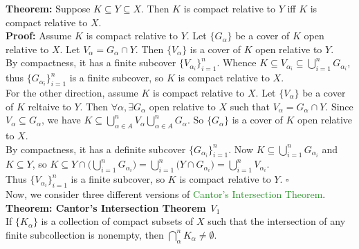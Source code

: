 \documentclass{article}
\begin{document}
\textbf{Theorem:} Suppose $K \subseteq Y \subseteq X$. Then $K$ is compact relative to $Y$ iff $K$ is compact relative to $X$. \\

\textbf{Proof:} Assume $K$ is compact relative to $Y$. Let $\{G_{\alpha}\}$ be a cover of $K$ open relative to $X$. Let $V_{\alpha}= G_{\alpha} \cap Y$. Then $\{V_{\alpha}\}$ is a cover of $K$ open relative to $Y$.\\

By compactness, it has a finite subcover $\{V_{\alpha_i}\}_{i=1}^n$. Whence $K \subseteq V_{\alpha_i} \subseteq \bigcup_{i = 1}^nG_{\alpha_i}$, thus $\{G_{\alpha_i}\}_{i=1}^n$ is a finite subcover, so $K$ is compact relative to $X$.\\

For the other direction, assume $K$ is compact relative to $X$. Let $\{V_{\alpha}\}$ be a cover of $K$ reltaive to $Y$. Then $\forall \alpha, \exists G_{\alpha}$ open relative to $X$ such that $V_{\alpha} = G_{\alpha} \cap Y$. Since $V_{\alpha} \subseteq G_{\alpha}$, we have $K \subseteq \bigcup_{\alpha \in A}^n V_{\alpha} \bigcup_{\alpha \in A}^nG_{\alpha}$. So $\{G_{\alpha}\}$ is a cover of $K$ open relative to $X$. \\

By compactness, it has a definite subcover $\{G_{\alpha_i}\}_{i=1}^n$. Now $K \subseteq \bigcup_{i=1}^n G_{\alpha_i}$ and $K \subseteq Y$, so $K \subseteq Y \cap \bigl(\bigcup_{i=1}^n G_{\alpha_i}\bigr)=\bigcup_{i=1}^n(Y \cap G_{\alpha_i}\bigr)=\bigcup_{i=1}^nV_{\alpha_i}$.\\

Thus $\{V_{\alpha_i}\}_{i=1}^n$ is a finite subcover, so $K$ is compact relative to $Y$. $\square$\\


Now, we consider three different versions of \textcolor{ForestGreen}{Cantor's Intersection Theorem}.\\

\textbf{Theorem: Cantor's Intersection Theorem} \textit{V$_1$}\\
If $\{K_{\alpha}\}$ is a collection of compact subsets of $X$ such that the intersection of any finite subcollection is nonempty, then $\bigcap_{\alpha}^nK_{\alpha} \neq \emptyset$.\\
\end{document}
